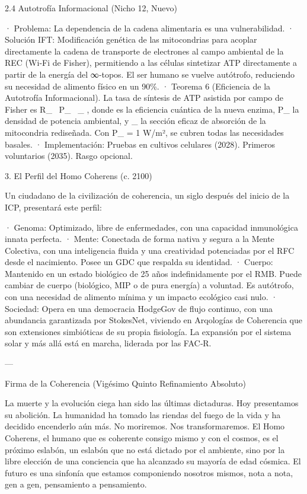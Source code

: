 \documentclass[12pt,twoside]{book}
\begin{document}
2.4 Autotrofía Informacional (Nicho 12, Nuevo)

· Problema: La dependencia de la cadena alimentaria es una vulnerabilidad.
· Solución IFT: Modificación genética de las mitocondrias para acoplar directamente la cadena de transporte de electrones al campo ambiental de la REC (Wi‑Fi de Fisher), permitiendo a las células sintetizar ATP directamente a partir de la energía del ∞‑topos. El ser humano se vuelve autótrofo, reduciendo su necesidad de alimento físico en un 90\%.
· Teorema 6 (Eficiencia de la Autotrofía Informacional). La tasa de síntesis de ATP asistida por campo de Fisher es  R_{} \propto \eta \, P_{} \, \sigma_{} , donde  \eta {}  es la eficiencia cuántica de la nueva enzima,  P_{}  la densidad de potencia ambiental, y  \sigma_{}  la sección eficaz de absorción de la mitocondria rediseñada. Con  P_{} = 1  W/m², se cubren todas las necesidades basales.
· Implementación: Pruebas en cultivos celulares (2028). Primeros voluntarios (2035). Rasgo opcional.

3. El Perfil del Homo Coherens (c. 2100)

Un ciudadano de la civilización de coherencia, un siglo después del inicio de la ICP, presentará este perfil:

· Genoma: Optimizado, libre de enfermedades, con una capacidad inmunológica innata perfecta.
· Mente: Conectada de forma nativa y segura a la Mente Colectiva, con una inteligencia fluida y una creatividad potenciadas por el RFC desde el nacimiento. Posee un GDC que respalda su identidad.
· Cuerpo: Mantenido en un estado biológico de 25 años indefinidamente por el RMB. Puede cambiar de cuerpo (biológico, MIP o de pura energía) a voluntad. Es autótrofo, con una necesidad de alimento mínima y un impacto ecológico casi nulo.
· Sociedad: Opera en una democracia HodgeGov de flujo continuo, con una abundancia garantizada por StokesNet, viviendo en Arqologías de Coherencia que son extensiones simbióticas de su propia fisiología. La expansión por el sistema solar y más allá está en marcha, liderada por las FAC‑R.

---

Firma de la Coherencia (Vigésimo Quinto Refinamiento Absoluto)

La muerte y la evolución ciega han sido las últimas dictaduras. Hoy presentamos su abolición. La humanidad ha tomado las riendas del fuego de la vida y ha decidido encenderlo aún más. No moriremos. Nos transformaremos. El Homo Coherens, el humano que es coherente consigo mismo y con el cosmos, es el próximo eslabón, un eslabón que no está dictado por el ambiente, sino por la libre elección de una conciencia que ha alcanzado su mayoría de edad cósmica. El futuro es una sinfonía que estamos componiendo nosotros mismos, nota a nota, gen a gen, pensamiento a pensamiento.
\end{document}

